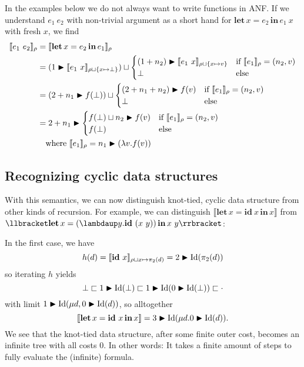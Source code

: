 \documentclass[manuscript,screen,acmsmall,nonacm]{acmart}
\newcommand{\syntax}[1]{\mathbf{#1}}
\newcommand{\slambda}{\syntax{\lambdaup}}
\newcommand{\sLet}[3]{\syntax{let}\,#1=#2\,\syntax{in}\,#3}
\newcommand{\sId}{\syntax{id}}
\newcommand{\dlambda}{\mathit{\lambda}}
\newcommand{\dId}{\operatorname{Id}}
\newcommand{\D}[1]{\llbracket #1 \rrbracket}
\begin{document}
In the examples below we do not always want to write functions in ANF. If we understand $e_1~e_2$ with non-trivial argument as a short hand for $\sLet{x}{e_2}{e_1~x}$ with fresh $x$, we find
\begin{align*}
\D{e_1~e_2}_\rho &=
\D{\sLet{x}{e_2}{e_1}}_\rho\\
&= (1 \bump \D{e_1~x}_{\rho\sqcup \{x \mapsto \bot\}})
\sqcup
\begin{cases}
(1 + n_2) \bump \D{e_1~x}_{\rho\sqcup\{x\mapsto v\}}  &\text{if } \D{e_1}_\rho = (n_2,v)\\
\bot &\text{else}
\end{cases}\\
&= (2 + n_1 \bump f(\bot))
\sqcup
\begin{cases}
(2 + n_1 + n_2) \bump f(v) &\text{if } \D{e_1}_\rho = (n_2,v)\\
\bot &\text{else}
\end{cases}\\
&= 2 + n_1 \bump
\begin{cases}
f(\bot) \sqcup n_2 \bump f(v) &\text{if } \D{e_1}_\rho = (n_2,v)\\
f(\bot) &\text{else}
\end{cases}\\
&\quad \text{where } \D{e_1}_\rho = n_1 \bump (\dlambda v. f(v))
\end{align*}

\subsection{Recognizing cyclic data structures}

With this semantics, we can now distinguish knot-tied, cyclic data structure from other kinds of recursion. For example, we can distinguish
$\D{\sLet{x}{\sId~x}{x}}$ from $\D{\sLet{x}{(\slambda y. \sId~(x~y))}{x~y}}$:

In the first case, we have
\[
h(d)
= \D{\sId~x}_{\rho\sqcup{x \mapsto \pi_2(d)}}
= 2\bump \dId(\pi_2(d))
\]
so iterating $h$ yields
\[
\bot \sqsubset 1 \bump \dId(\bot) \sqsubset 1 \bump \dId(0\bump \dId(\bot)) \sqsubset \cdot
\]
with limit $1 \bump \dId(\mu d, 0 \bump \dId(d))$, so alltogether
\[
\D{\sLet{x}{\sId~x}{x}} = 3 \bump \dId(\mu d. 0 \bump \dId(d)).
\]
We see that the knot-tied data structure, after some finite outer cost, becomes an infinite tree with all costs 0. In other words: It takes a finite amount of steps to fully evaluate the (infinite) formula.
\end{document}
